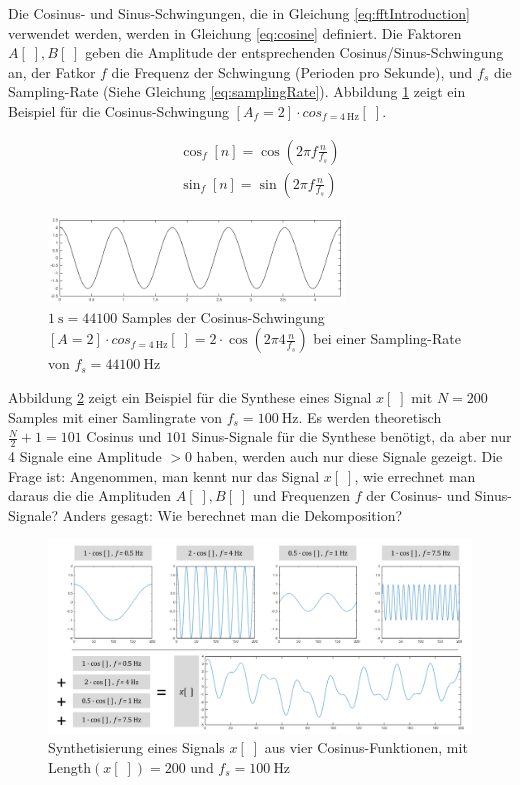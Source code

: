 Die Cosinus- und Sinus-Schwingungen, die in Gleichung \ref{eq:fftIntroduction} verwendet werden, werden in Gleichung \ref{eq:cosine} definiert. Die Faktoren $A[\;],B[\;]$ geben die Amplitude der entsprechenden Cosinus/Sinus-Schwingung an, der Fatkor $f$ die Frequenz der Schwingung (Perioden pro Sekunde), und $f_s$ die Sampling-Rate (Siehe Gleichung \ref{eq:samplingRate}). \cite[S. 62]{dspMichigan} \cite[S. 150]{dspGuide} Abbildung \ref{img:aSimpleCosine} zeigt ein Beispiel für die Cosinus-Schwingung $[A_f=2] \cdot cos_{f=\SI{4}{\hertz}}[\;]$.

\begin{equation}
\label{eq:cosine}
\begin{gathered}
\cos_{f}[n]  = \cos(2\pi f \frac{n}{f_s}) \\
\sin_{f}[n]  = \sin(2\pi f \frac{n}{f_s})
\end{gathered}
\end{equation}

\begin{figure}[h]
	\centering
	\includegraphics[width=0.7\textwidth]{bilder/aSimpleCosine.png}
	\caption{$\SI{1}{\second} = 44100 $ Samples der Cosinus-Schwingung $[A = 2] \cdot cos_{f=\SI{4}{\hertz}}[\;] =  2 \cdot \cos(2\pi 4 \frac{n}{f_s})$ bei einer Sampling-Rate von $f_s = \SI{44100}{\hertz} $}
	\label{img:aSimpleCosine}
\end{figure}

Abbildung \ref{img:fftExample02} zeigt ein Beispiel für die Synthese eines Signal $x[\;]$ mit $N = 200$ Samples mit einer Samlingrate von $f_s = \SI{100}{\hertz}$. Es werden theoretisch $\frac{N}{2} + 1 = 101$ Cosinus und $101$ Sinus-Signale für die Synthese benötigt, da aber nur 4 Signale eine Amplitude $> 0$ haben, werden auch nur diese Signale gezeigt. Die Frage ist: Angenommen, man kennt nur das Signal $x[\;]$, wie errechnet man daraus die die Amplituden $A[\;], B[\;]$ und Frequenzen $f$ der Cosinus- und Sinus-Signale? Anders gesagt: Wie berechnet man die Dekomposition?

\begin{figure}[h]
	\centering
	\includegraphics[width=1\textwidth]{bilder/fftExp05.png}
	\caption{Synthetisierung eines Signals $x[\;]$ aus vier Cosinus-Funktionen, mit Length$(x[\;]) = 200$ und $f_s = \SI{100}{\hertz}$}
	\label{img:fftExample02}
\end{figure}


